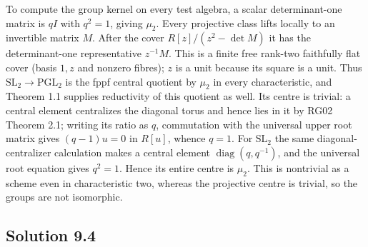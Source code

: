 \documentclass[11pt,a4paper,openany]{report}
\begin{document}
To compute the group kernel on every test algebra, a scalar determinant-one matrix is \(qI\) with \(q^2=1\), giving \(\mu_2\). Every projective class lifts locally to an invertible matrix \(M\). After the cover \(R[z]/(z^2-\det M)\) it has the determinant-one representative \(z^{-1}M\). This is a finite free rank-two faithfully flat cover (basis \(1,z\) and nonzero fibres); \(z\) is a unit because its square is a unit. Thus \(\mathrm{SL}_2\to\mathrm{PGL}_2\) is the fppf central quotient by \(\mu_2\) in every characteristic, and Theorem 1.1 supplies reductivity of this quotient as well. Its centre is trivial: a central element centralizes the diagonal torus and hence lies in it by RG02 Theorem 2.1; writing its ratio as \(q\), commutation with the universal upper root matrix gives \((q-1)u=0\) in \(R[u]\), whence \(q=1\). For \(\mathrm{SL}_2\) the same diagonal-centralizer calculation makes a central element \(\operatorname{diag}(q,q^{-1})\), and the universal root equation gives \(q^2=1\). Hence its entire centre is \(\mu_2\). This is nontrivial as a scheme even in characteristic two, whereas the projective centre is trivial, so the groups are not isomorphic.

\subsection{Solution 9.4}\label{AG-RG-03-solution-9.4}
\end{document}
